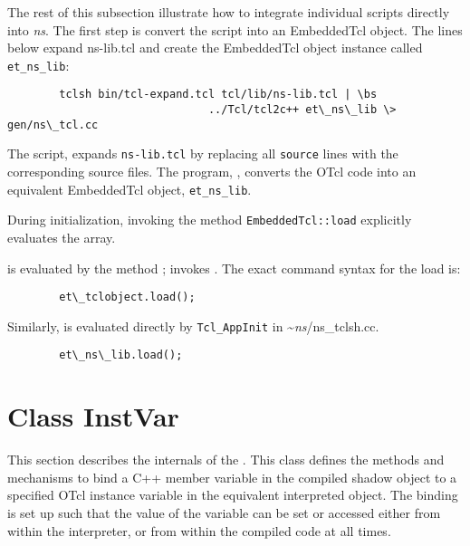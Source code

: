 The rest of this subsection illustrate
how to integrate individual scripts directly into \emph{ns}.
The first step is convert the script into an EmbeddedTcl object.
The lines below expand ns-lib.tcl and create the EmbeddedTcl object
instance called {\tt et\_ns\_lib}:
\begin{verbatim}
        tclsh bin/tcl-expand.tcl tcl/lib/ns-lib.tcl | \bs
                               ../Tcl/tcl2c++ et\_ns\_lib \> gen/ns\_tcl.cc
\end{verbatim}
The script, 
expands {\tt ns-lib.tcl} by replacing all {\tt source} lines
with the corresponding source files.
The program, ,
converts the OTcl code into an equivalent EmbeddedTcl object, {\tt et\_ns\_lib}.

During initialization, invoking the method {\tt EmbeddedTcl::load}
explicitly evaluates the array.
\begin{list}{---}{}
\item
  is evaluated by the method
  ;
  invokes .
  The exact command syntax for the load is:
  \begin{verbatim}
        et\_tclobject.load();
  \end{verbatim}
\item
  Similarly,
  is evaluated directly by {\tt Tcl\_AppInit} in \textasciitilde\emph{ns}/{ns\_tclsh.cc}.
  \begin{verbatim}
        et\_ns\_lib.load();
  \end{verbatim}
\end{list}

\section{Class InstVar}
\label{sec:InstVar}

This section describes the internals of the .
This class defines the methods and mechanisms to bind
a C++ member variable in the compiled shadow object
to a specified OTcl instance variable in the equivalent interpreted object.
The binding is set up such that the value of the variable can be
set or accessed either from within the interpreter, or from
within the compiled code at all times.

